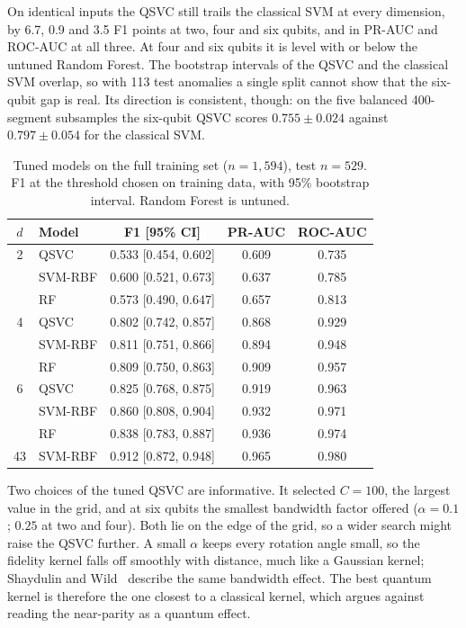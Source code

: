 \documentclass[conference]{IEEEtran}
\begin{document}
On identical inputs the QSVC still trails the classical SVM at every dimension, by 6.7, 0.9
and 3.5 F1 points at two, four and six qubits, and in PR-AUC and ROC-AUC at all three. At four
and six qubits it is level with or below the untuned Random Forest. The bootstrap intervals of
the QSVC and the classical SVM overlap, so with 113 test anomalies a single split cannot show
that the six-qubit gap is real. Its direction is consistent, though: on the five balanced
400-segment subsamples the six-qubit QSVC scores $0.755 \pm 0.024$ against $0.797 \pm 0.054$
for the classical SVM.

\begin{table}[t]
\caption{Tuned models on the full training set ($n = 1{,}594$), test $n = 529$. F1 at the
threshold chosen on training data, with 95\% bootstrap interval. Random Forest is untuned.}
\label{tab:fair}
\centering
\setlength{\tabcolsep}{4pt}
\begin{tabular}{clccc}
\toprule
$d$ & Model & F1 [95\% CI] & PR-AUC & ROC-AUC \\
\midrule
2 & QSVC    & 0.533 [0.454, 0.602] & 0.609 & 0.735 \\
  & SVM-RBF & 0.600 [0.521, 0.673] & 0.637 & 0.785 \\
  & RF      & 0.573 [0.490, 0.647] & 0.657 & 0.813 \\
\midrule
4 & QSVC    & 0.802 [0.742, 0.857] & 0.868 & 0.929 \\
  & SVM-RBF & 0.811 [0.751, 0.866] & 0.894 & 0.948 \\
  & RF      & 0.809 [0.750, 0.863] & 0.909 & 0.957 \\
\midrule
6 & QSVC    & 0.825 [0.768, 0.875] & 0.919 & 0.963 \\
  & SVM-RBF & 0.860 [0.808, 0.904] & 0.932 & 0.971 \\
  & RF      & 0.838 [0.783, 0.887] & 0.936 & 0.974 \\
\midrule
43 & SVM-RBF & 0.912 [0.872, 0.948] & 0.965 & 0.980 \\
\bottomrule
\end{tabular}
\end{table}

Two choices of the tuned QSVC are informative. It selected $C = 100$, the largest value in the
grid, and at six qubits the smallest bandwidth factor offered ($\alpha = 0.1$; $0.25$ at two and
four). Both lie on the edge of the grid, so a wider search might raise the QSVC further. A
small $\alpha$ keeps every rotation angle small, so the fidelity kernel falls off smoothly
with distance, much like a Gaussian kernel; Shaydulin and Wild~\cite{shaydulin2022} describe
the same bandwidth effect. The best quantum kernel is therefore the one closest to a classical
kernel, which argues against reading the near-parity as a quantum effect.
\end{document}
